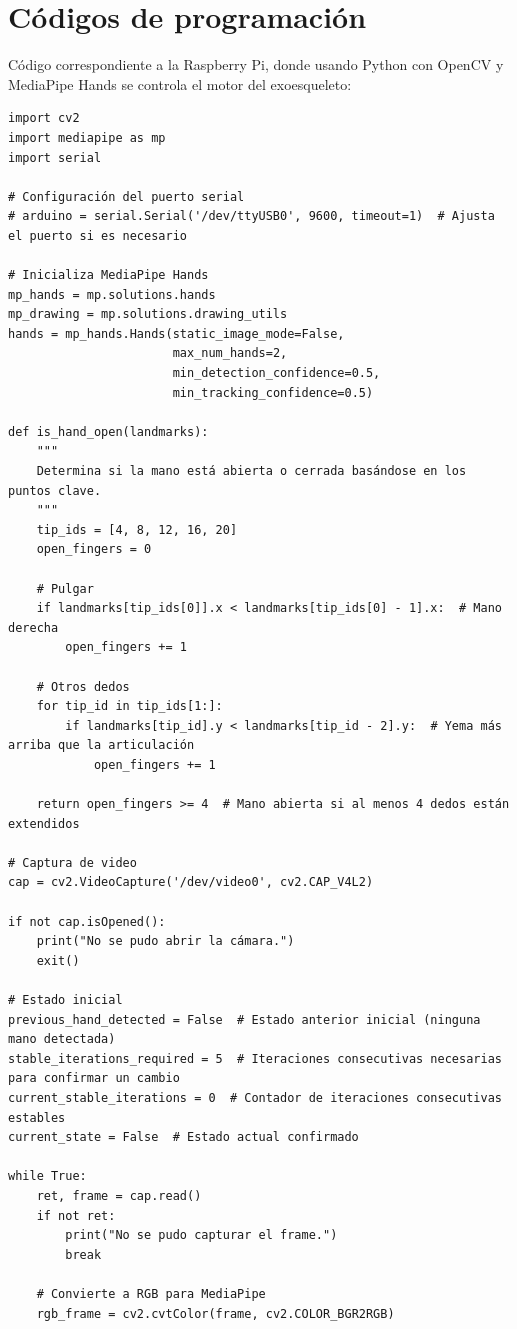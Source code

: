 \section{Códigos de programación}
Código correspondiente a la Raspberry Pi, donde usando Python con OpenCV y MediaPipe Hands se controla el motor del exoesqueleto:
\begin{verbatim}
import cv2
import mediapipe as mp
import serial

# Configuración del puerto serial
# arduino = serial.Serial('/dev/ttyUSB0', 9600, timeout=1)  # Ajusta el puerto si es necesario

# Inicializa MediaPipe Hands
mp_hands = mp.solutions.hands
mp_drawing = mp.solutions.drawing_utils
hands = mp_hands.Hands(static_image_mode=False,
                       max_num_hands=2,
                       min_detection_confidence=0.5,
                       min_tracking_confidence=0.5)

def is_hand_open(landmarks):
    """
    Determina si la mano está abierta o cerrada basándose en los puntos clave.
    """
    tip_ids = [4, 8, 12, 16, 20]
    open_fingers = 0

    # Pulgar
    if landmarks[tip_ids[0]].x < landmarks[tip_ids[0] - 1].x:  # Mano derecha
        open_fingers += 1

    # Otros dedos
    for tip_id in tip_ids[1:]:
        if landmarks[tip_id].y < landmarks[tip_id - 2].y:  # Yema más arriba que la articulación
            open_fingers += 1

    return open_fingers >= 4  # Mano abierta si al menos 4 dedos están extendidos

# Captura de video
cap = cv2.VideoCapture('/dev/video0', cv2.CAP_V4L2)

if not cap.isOpened():
    print("No se pudo abrir la cámara.")
    exit()

# Estado inicial
previous_hand_detected = False  # Estado anterior inicial (ninguna mano detectada)
stable_iterations_required = 5  # Iteraciones consecutivas necesarias para confirmar un cambio
current_stable_iterations = 0  # Contador de iteraciones consecutivas estables
current_state = False  # Estado actual confirmado

while True:
    ret, frame = cap.read()
    if not ret:
        print("No se pudo capturar el frame.")
        break

    # Convierte a RGB para MediaPipe
    rgb_frame = cv2.cvtColor(frame, cv2.COLOR_BGR2RGB)


\end{verbatim}
